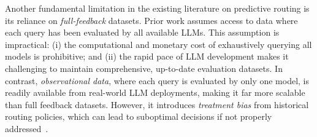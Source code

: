 \documentclass{article}
\theoremstyle{remark}
\begin{document}




Another fundamental limitation in the existing literature on predictive routing is its reliance on \emph{full-feedback} datasets. Prior work \citep{ong2406routellm} \citep{somerstep2025carrot} assumes access to data where each query has been evaluated by all available LLMs. This assumption is impractical: (i) the computational and monetary cost of exhaustively querying all models is prohibitive; and (ii) the rapid pace of LLM development makes it challenging to maintain comprehensive, up-to-date evaluation datasets. In contrast, \emph{observational data}, where each query is evaluated by only one model, is readily available from real-world LLM deployments, making it far more scalable than full feedback datasets. However, it introduces \emph{treatment bias} from historical routing policies, which can lead to suboptimal decisions if not properly addressed~\citep{swaminathan2015batch, kunzel2019metalearners}.%
\end{document}
